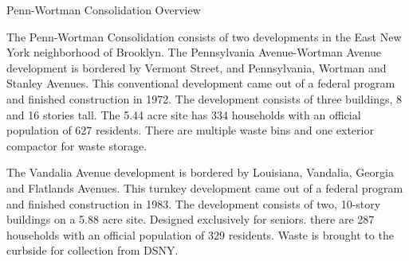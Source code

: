 Penn-Wortman Consolidation Overview

The Penn-Wortman Consolidation consists of two developments in the East New York neighborhood of Brooklyn. The Pennsylvania Avenue-Wortman Avenue development is bordered by Vermont Street, and Pennsylvania, Wortman and Stanley Avenues. This conventional development came out of a federal program and finished construction in 1972. The development consists of three buildings, 8 and 16 stories tall. The 5.44 acre site has 334 households with an official population of 627 residents. There are multiple waste bins and one exterior compactor for waste storage.

The Vandalia Avenue development is bordered by Louisiana, Vandalia, Georgia and Flatlands Avenues. This turnkey development came out of a federal program and finished construction in 1983. The development consists of two, 10-story buildings on a 5.88 acre site. Designed exclusively for seniors. there are 287 households with an official population of 329 residents. Waste is brought to the curbside for collection from DSNY.